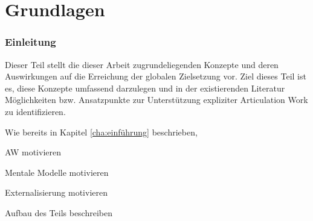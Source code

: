 \part{Grundlagen} %
\label{prt:grundlagen}

\section*{Einleitung} %
\label{sec:grundlagen_einleitung}
\thispagestyle{empty}

Dieser Teil stellt die dieser Arbeit zugrundeliegenden Konzepte und deren Auswirkungen auf die Erreichung der globalen Zielsetzung vor. Ziel dieses Teil ist es, diese Konzepte umfassend darzulegen und in der existierenden Literatur Möglichkeiten bzw. Ansatzpunkte zur Unterstützung expliziter Articulation Work zu identifizieren.

Wie bereits in Kapitel \ref{cha:einführung} beschrieben, 

AW motivieren

Mentale Modelle motivieren

Externalisierung motivieren

Aufbau des Teils beschreiben






